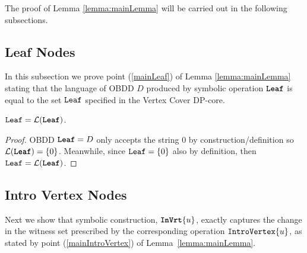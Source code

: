 The proof of Lemma \ref{lemma:mainLemma} will be carried out in the following subsections. 


\subsection{Leaf Nodes}

In this subsection we prove point (\ref{mainLeaf}) of Lemma \ref{lemma:mainLemma} stating that the language of OBDD $D$ produced by symbolic operation $\texttt{\textbf{Leaf}}$ is equal to the set $\texttt{Leaf}$ specified in the {\sc Vertex Cover} DP-core.


\begin{lemma}
\label{lemma:SymbolicLeaf}
    $\texttt{Leaf} = \mathcal{L}(\texttt{\textbf{Leaf}})$. 
\end{lemma}
\begin{proof}
    OBDD $\texttt{\textbf{Leaf}} = D$ only accepts the string $0$ by construction/definition so $\mathcal{L}(\texttt{\textbf{Leaf}}) = \{0\}$. Meanwhile, since $\texttt{Leaf} =  \{0\}$ also by definition, then $\texttt{Leaf} = \mathcal{L}(\texttt{\textbf{Leaf}})$.
\end{proof}


\subsection{Intro Vertex Nodes}

Next we show that symbolic construction, $\texttt{\textbf{InVrt}}\{u\}$, exactly captures the change in the witness set prescribed by the corresponding operation $\texttt{IntroVertex}\{u\}$, as stated by point (\ref{mainIntroVertex}) of Lemma~\ref{lemma:mainLemma}.

